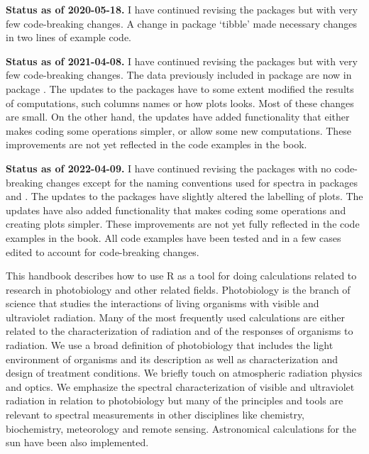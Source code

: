 \begin{shaded}
\noindent
\textbf{Status as of 2020-05-18.} I have continued revising the packages but with very few code-breaking changes. A change in package `tibble' made necessary changes in two lines of example code.
\end{shaded}

\begin{shaded}
\noindent
\textbf{Status as of 2021-04-08.} I have continued revising the packages but with very few code-breaking changes. The data previously included in package  are now in package . The updates to the packages have to some extent modified the results of computations, such columns names or how plots looks. Most of these changes are small. On the other hand, the updates have added functionality that either makes coding some operations simpler, or allow some new computations. These improvements are not yet reflected in the code examples in the book.
\end{shaded}

\begin{shaded}
\noindent
\textbf{Status as of 2022-04-09.} I have continued revising the packages with no code-breaking changes except for the naming conventions used for spectra in packages  and . The updates to the packages have slightly altered the labelling of plots. The updates have also added functionality that makes coding some operations and creating plots simpler. These improvements are not yet fully reflected in the code examples in the book. All code examples have been tested and in a few cases edited to account for code-breaking changes.
\end{shaded}

This handbook describes how to use R as a tool for doing calculations related to research in photobiology and other related fields. Photobiology is the branch of science that studies the interactions of living organisms with visible and ultraviolet radiation. Many of the most frequently used calculations are either related to the characterization of radiation and of the responses of organisms to radiation. We use a broad definition of photobiology that includes the light environment of organisms and its description as well as characterization and design of treatment conditions. We briefly touch on atmospheric radiation physics and optics. We emphasize the spectral characterization of visible and ultraviolet radiation in relation to photobiology but many of the principles and tools are relevant to spectral measurements in other disciplines like chemistry, biochemistry, meteorology and remote sensing. Astronomical calculations for the sun have been also implemented.

